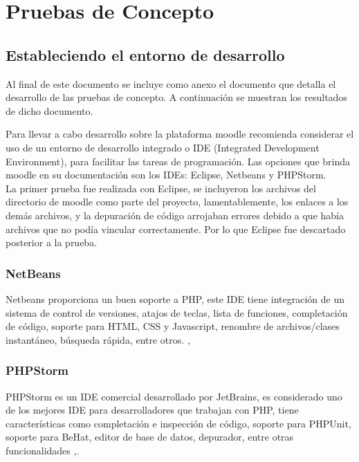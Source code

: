 \chapter{Pruebas de Concepto}
\label{ch:pruebasConcepto}

\section{Estableciendo el entorno de desarrollo}

 Al final de este documento se incluye como anexo el documento que detalla el desarrollo de las pruebas de concepto. A continuación se muestran los resultados de dicho documento.

Para llevar a cabo desarrollo sobre la plataforma moodle recomienda considerar el uso de un entorno de desarrollo integrado o IDE (Integrated Development Environment), para facilitar las tareas de programación. Las opciones que brinda moodle en su documentación son los IDEs: Eclipse, Netbeans y PHPStorm.\\

\noindent La primer prueba fue realizada con Eclipse, se incluyeron los archivos del directorio de moodle como parte del proyecto, lamentablemente, los enlaces a los demás archivos, y la depuración de código arrojaban errores debido a que había archivos que no podía vincular correctamente. Por lo que Eclipse fue descartado posterior a la prueba.

\subsection{NetBeans}

Netbeans proporciona un buen soporte a PHP, este IDE tiene integración de un sistema de control de versiones, atajos de teclas, lista de funciones, completación de código, soporte para HTML, CSS y Javascript, renombre de archivos/clases instantáneo, búsqueda rápida, entre otros. \cite{NetBeans},\cite{ moodleNetbeans}


\subsection{PHPStorm}

PHPStorm es un IDE comercial desarrollado por JetBrains, es considerado uno de los mejores IDE para desarrolladores que trabajan con PHP, tiene características como completación e inspección de código, soporte para PHPUnit, soporte para BeHat, editor de base de datos, depurador, entre otras funcionalidades \cite{PHPStorm},\cite{  moodlePHPStorm}.

